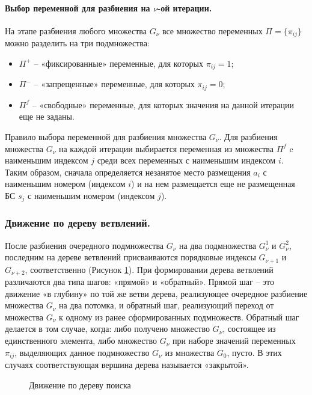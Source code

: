 \paragraph{Выбор переменной для разбиения на $\nu$-ой итерации.}

На этапе разбиения любого множества $G_\nu$ все множество переменных $\Pi = \{\pi_{ij}\}$ можно разделить на три подмножества: 

\begin{itemize}
  \item $\Pi^+$ -- «фиксированные» переменные, для которых $\pi_{ij}=1$;
  \item $\Pi^-$ -- «запрещенные» переменные, для которых $\pi_{ij}=0$;
  \item $\Pi^f$ -- «свободные» переменные, для которых значения на данной итерации еще не заданы.
\end{itemize}
Правило выбора переменной для разбиения множества $G_\nu$. Для разбиения множества $G_\nu$ на каждой итерации выбирается переменная из множества $\Pi^f$ c наименьшим индексом $j$ среди всех переменных с наименьшим индексом $i$. Таким образом, сначала определяется незанятое место размещения $a_i$ с наименьшим номером (индексом $i$) и на нем размещается еще не размещенная БС $s_j$ с наименьшим номером (индексом $j$).

\subsubsection{Движение по дереву ветвлений.}

После разбиения очередного подмножества $G_\nu$ на два подмножества $G^1_\nu$  и $G^2_\nu$, последним на дереве ветвлений присваиваются порядковые индексы $G_{\nu+1}$ и $G_{\nu+2}$, соответственно (Рисунок \ref{fig:part2_tree_traversal}).
При формировании дерева ветвлений различаются два типа шагов: «прямой» и «обратный». Прямой шаг -- это движение «в глубину» по той же ветви дерева, реализующее очередное разбиение множества $G_\nu$ на два потомка, и обратный шаг, реализующий переход от множества $G_\nu$  к одному из ранее сформированных подмножеств. Обратный шаг делается в том случае, когда: либо получено множество $G_\nu$, состоящее из единственного элемента, либо множество $G_\nu$  при наборе значений переменных $\pi_{ij}$, выделяющих данное подмножество $G_\nu$ из множества $G_0$, пусто. В этих случаях соответствующая вершина дерева называется «закрытой».

\begin{figure}[ht]
  \caption{Движение по дереву поиска}\label{fig:part2_tree_traversal}
\end{figure}

